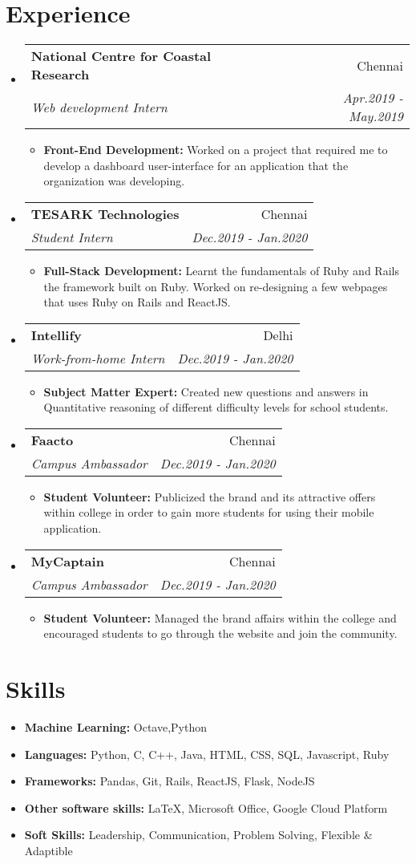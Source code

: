 \documentclass[letterpaper,12pt]{article}
\makeatletter
\newcommand{\resumeItem}[2]{
\item\small{
\textbf{#1}{ #2 \vspace{-2pt}}
}
}
\newcommand{\resumeSubheading}[4]{
\vspace{-1pt}\item
\begin{tabular*}{0.97\textwidth}{l@{\extracolsep{\fill}}r}
\textbf{#1} & #2 \\
\textit{\small#3} & \textit{\small #4} \\
\end{tabular*}\vspace{-5pt}
}
\newcommand{\resumeSubHeadingListStart}{\begin{itemize}[leftmargin=*]}
\newcommand{\resumeSubHeadingListEnd}{\end{itemize}}
\newcommand{\resumeItemListStart}{\begin{itemize}}
\newcommand{\resumeItemListEnd}{\end{itemize}\vspace{-5pt}}
\makeatother
\begin{document}
\section{Experience}
\resumeSubHeadingListStart
\resumeSubheading
{National Centre for Coastal Research}{Chennai}
{Web development Intern}{Apr.2019 - May.2019}
\resumeItemListStart
\resumeItem{Front-End Development:}
{Worked on a project that required me to develop a dashboard user-interface for an application that the organization was developing.}
\resumeItemListEnd
\resumeSubheading
{TESARK Technologies}{Chennai}
{Student Intern}{Dec.2019 - Jan.2020}
\resumeItemListStart
\resumeItem{Full-Stack Development:}
{Learnt the fundamentals of Ruby and Rails the framework built on Ruby. Worked on re-designing a few webpages that uses Ruby on Rails and ReactJS.}
\resumeItemListEnd
\resumeSubheading
{Intellify}{Delhi}
{Work-from-home Intern}{Dec.2019 - Jan.2020}
\resumeItemListStart
\resumeItem{Subject Matter Expert:}
{Created new questions and answers in Quantitative reasoning of different difficulty levels for school students.}
\resumeItemListEnd
\resumeSubheading
{Faacto}{Chennai}
{Campus Ambassador}{Dec.2019 - Jan.2020}
\resumeItemListStart
\resumeItem{Student Volunteer:}
{Publicized the brand and its attractive offers within college in order to gain more students for using their mobile application.}
\resumeItemListEnd
\resumeSubheading
{MyCaptain}{Chennai}
{Campus Ambassador}{Dec.2019 - Jan.2020}
\resumeItemListStart
\resumeItem{Student Volunteer:}{
Managed the brand affairs within the college and encouraged students to go through the website and join the community.}
\resumeItemListEnd
\resumeSubHeadingListEnd

\section{Skills}
\resumeSubHeadingListStart
\resumeItem{Machine Learning:}{Octave,Python}
\resumeItem{Languages:}{Python, C, C++, Java, HTML, CSS, SQL, Javascript, Ruby}
\resumeItem{Frameworks:}{Pandas, Git, Rails, ReactJS, Flask, NodeJS}
\resumeItem{Other software skills:}{LaTeX, Microsoft Office, Google Cloud Platform}
\resumeItem{Soft Skills:}{Leadership, Communication, Problem Solving, Flexible \& Adaptible} 
\resumeSubHeadingListEnd
\end{document}

